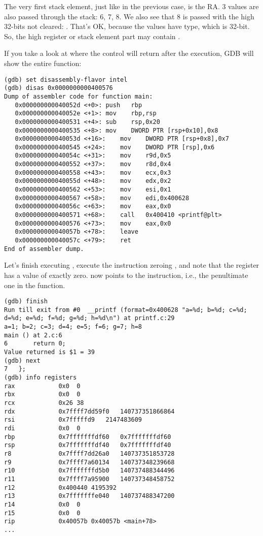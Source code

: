 The very first stack element, just like in the previous case, is the \ac{RA}.
3 values are also passed through the stack: 6, 7, 8.
We also see that 8 is passed with the high 32-bits not cleared: .
That's OK, because the values have \Tint type, which is 32-bit.
So, the high register or stack element part may contain .

If you take a look at where the control will return after the \printf execution,
\ac{GDB} will show the entire \main function:

\begin{lstlisting}[style=customasm]
(gdb) set disassembly-flavor intel
(gdb) disas 0x0000000000400576
Dump of assembler code for function main:
   0x000000000040052d <+0>:	push   rbp
   0x000000000040052e <+1>:	mov    rbp,rsp
   0x0000000000400531 <+4>:	sub    rsp,0x20
   0x0000000000400535 <+8>:	mov    DWORD PTR [rsp+0x10],0x8
   0x000000000040053d <+16>:	mov    DWORD PTR [rsp+0x8],0x7
   0x0000000000400545 <+24>:	mov    DWORD PTR [rsp],0x6
   0x000000000040054c <+31>:	mov    r9d,0x5
   0x0000000000400552 <+37>:	mov    r8d,0x4
   0x0000000000400558 <+43>:	mov    ecx,0x3
   0x000000000040055d <+48>:	mov    edx,0x2
   0x0000000000400562 <+53>:	mov    esi,0x1
   0x0000000000400567 <+58>:	mov    edi,0x400628
   0x000000000040056c <+63>:	mov    eax,0x0
   0x0000000000400571 <+68>:	call   0x400410 <printf@plt>
   0x0000000000400576 <+73>:	mov    eax,0x0
   0x000000000040057b <+78>:	leave  
   0x000000000040057c <+79>:	ret    
End of assembler dump.
\end{lstlisting}

Let's finish executing \printf, execute the instruction
zeroing \EAX, and note that the \EAX register has a value of exactly zero.
\RIP now points to the  instruction, i.e., the penultimate one in the \main function.

\begin{lstlisting}
(gdb) finish
Run till exit from #0  __printf (format=0x400628 "a=%d; b=%d; c=%d; d=%d; e=%d; f=%d; g=%d; h=%d\n") at printf.c:29
a=1; b=2; c=3; d=4; e=5; f=6; g=7; h=8
main () at 2.c:6
6		return 0;
Value returned is $1 = 39
(gdb) next
7	};
(gdb) info registers
rax            0x0	0
rbx            0x0	0
rcx            0x26	38
rdx            0x7ffff7dd59f0	140737351866864
rsi            0x7fffffd9	2147483609
rdi            0x0	0
rbp            0x7fffffffdf60	0x7fffffffdf60
rsp            0x7fffffffdf40	0x7fffffffdf40
r8             0x7ffff7dd26a0	140737351853728
r9             0x7ffff7a60134	140737348239668
r10            0x7fffffffd5b0	140737488344496
r11            0x7ffff7a95900	140737348458752
r12            0x400440	4195392
r13            0x7fffffffe040	140737488347200
r14            0x0	0
r15            0x0	0
rip            0x40057b	0x40057b <main+78>
...
\end{lstlisting}
